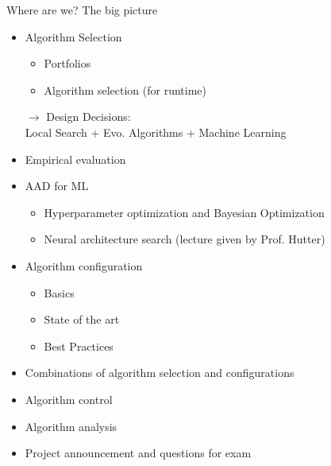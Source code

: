 \begin{frame}[c]{Where are we? The big picture}

\begin{itemize}
\item Algorithm Selection
  \begin{itemize}
    \item Portfolios
    \item Algorithm selection (for runtime)
  \end{itemize}
  \item[$\to$] Design Decisions:\\ Local Search + Evo. Algorithms + Machine Learning 
  \item Empirical evaluation
  \item AAD for ML
  \begin{itemize}
    \item Hyperparameter optimization and Bayesian Optimization 
    \item Neural architecture search (lecture given by Prof. Hutter)
  \end{itemize}
  \item Algorithm configuration 
  \begin{itemize}
    \item Basics 
    \item State of the art 
    \item Best Practices 
  \end{itemize}
  \item Combinations of algorithm selection and configurations
  \item Algorithm control 
  \item Algorithm analysis 
  \item Project announcement and questions for exam 
\end{itemize}

\end{frame}
